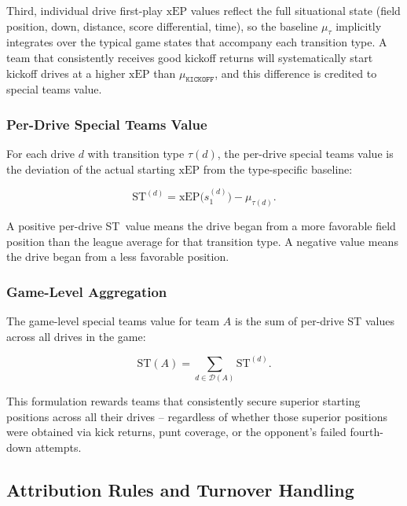 Third, individual drive first-play $\mathrm{xEP}$ values reflect the full
situational state (field position, down, distance, score differential, time),
so the baseline $\mu_\tau$ implicitly integrates over the typical game states
that accompany each transition type. A team that consistently receives good
kickoff returns will systematically start kickoff drives at a higher
$\mathrm{xEP}$ than $\mu_{\texttt{KICKOFF}}$, and this difference is credited
to special teams value.

\subsubsection{Per-Drive Special Teams Value}

For each drive $d$ with transition type $\tau(d)$, the per-drive special
teams value is the deviation of the actual starting $\mathrm{xEP}$ from the
type-specific baseline:

\begin{equation}
  \label{eq:st-drive}
  \mathrm{ST}^{(d)} = \mathrm{xEP}\!\bigl(s_1^{(d)}\bigr) - \mu_{\tau(d)}.
\end{equation}

A positive per-drive ST~value means the drive began from a more favorable
field position than the league average for that transition type. A negative
value means the drive began from a less favorable position.

\subsubsection{Game-Level Aggregation}

The game-level special teams value for team $A$ is the sum of per-drive
ST values across all drives in the game:

\begin{equation}
  \label{eq:st-game}
  \mathrm{ST}(A) = \sum_{d \in \mathcal{D}(A)} \mathrm{ST}^{(d)}.
\end{equation}

This formulation rewards teams that consistently secure superior starting
positions across all their drives -- regardless of whether those superior
positions were obtained via kick returns, punt coverage, or the opponent's
failed fourth-down attempts.

\subsection{Attribution Rules and Turnover Handling}
\label{sec:attribution}

